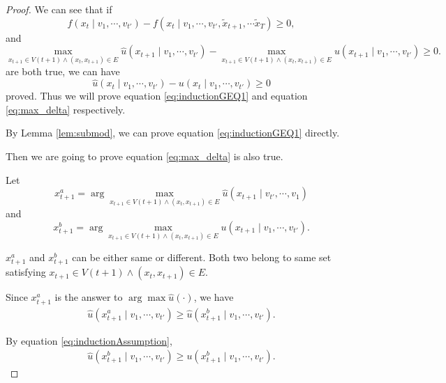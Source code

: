 \documentclass[12pt]{article}
\begin{document}
\begin{lem}
\begin{proof}
We can see that if 
\begin{equation}
\label{eq:inductionGEQ1}
f( x_{t} \mid v_{1} , \cdots , v_{t'} ) - f(x_{t} \mid v_{1} , \cdots , v_{t'}, \tilde{x}_{t+1}, \cdots \tilde{x}_{T} ) \geq 0,
\end{equation}
and
\begin{equation}
\label{eq:max_delta}
\max_{ x_{t+1} \in V(t+1) \land ( x_{t}, x_{t+1} ) \in E } \hat{u}( x_{t+1} \mid v_{1} , \cdots , v_{t'} ) - \max_{ x_{t+1} \in V(t+1) \land ( x_{t}, x_{t+1} ) \in E } u( x_{t+1} \mid v_{1} , \cdots , v_{t'} ) \geq 0.
\end{equation}
are both true, we can have
\begin{equation}
\label{eq:extendDifference_geq_0}
\hat{u}( x_{t} \mid v_{1} , \cdots , v_{t'} ) - u( x_{t} \mid v_{1} , \cdots , v_{t'} ) \geq 0
\end{equation}
proved. Thus we will prove equation \eqref{eq:inductionGEQ1} and equation \eqref{eq:max_delta} respectively.

By Lemma \ref{lem:submod}, we can prove equation \eqref{eq:inductionGEQ1} directly.

Then we are going to prove equation \eqref{eq:max_delta} is also true.

Let 
\begin{equation}
\label{eq:arg_x_a}
x^{a}_{t+1} = \arg \max_{ x_{t+1} \in V(t+1) \land ( x_{t}, x_{t+1} ) \in E} \hat{u}( x_{t+1} \mid v_{t'} , \cdots , v_{1} )
\end{equation}
and 
\begin{equation}
\label{eq:arg_x_b}
x^{b}_{t+1} = \arg \max_{ x_{t+1} \in V(t+1) \land ( x_{t}, x_{t+1}) \in E } u( x_{t+1} \mid v_{1} , \cdots , v_{t'} ). 
\end{equation}

$ x^{a}_{t+1} $ and $ x^{b}_{t+1} $ can be either same or different. Both two belong to same set satisfying $ x_{t+1} \in V(t+1) \land (x_{t}, x_{t+1}) \in E $.

Since $ x^{a}_{t+1} $ is the answer to $ \arg \max \hat{u}(\cdot) $, we have
\begin{equation}
\label{eq:bigger1}
\begin{aligned}
\hat{u}( x^{a}_{t+1} \mid v_{1} , \cdots , v_{t'} ) \geq \hat{u}( x^{b}_{t+1} \mid v_{1} , \cdots , v_{t'} ).
\end{aligned}
\end{equation}


By equation \eqref{eq:inductionAssumption},
\begin{equation}
\label{eq:bigger2}
\begin{aligned}
\hat{u}( x^{b}_{t+1} \mid v_{1} , \cdots , v_{t'} ) \geq u( x^{b}_{t+1} \mid v_{1} , \cdots , v_{t'} ).
\end{aligned}
\end{equation}


\end{proof}
\end{lem}
\end{document}
